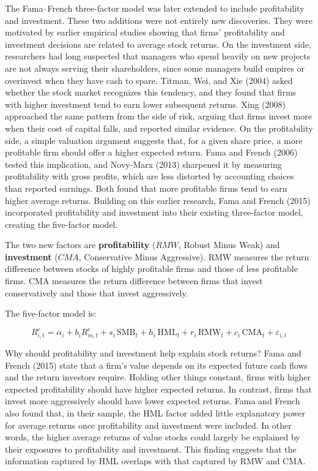 The Fama--French three-factor model was later extended to include profitability and investment. These two additions were not entirely new
discoveries. They were motivated by earlier empirical studies showing that firms' profitability and investment decisions are related to
average stock returns. On the investment side, researchers had long suspected that managers who spend heavily on new projects are not always serving
their shareholders, since some managers build empires or overinvest when they have cash to spare. Titman, Wei, and Xie (2004) asked
whether the stock market recognizes this tendency, and they found that firms with higher investment tend to earn lower subsequent
returns. Xing (2008) approached the same pattern from the side of risk, arguing that firms invest more when their cost of capital falls,
and reported similar evidence. On the profitability side, a simple valuation argument suggests that, for a given share price, a more
profitable firm should offer a higher expected return. Fama and French (2006) tested this implication, and Novy-Marx (2013) sharpened
it by measuring profitability with gross profits, which are less distorted by accounting choices than reported earnings. Both found that more
profitable firms tend to earn higher average returns. Building on this earlier research, Fama and French (2015) incorporated profitability
and investment into their existing three-factor model, creating the five-factor model.

The two new factors are \textbf{profitability}  ($RMW$, Robust Minus Weak) and
\textbf{investment} ($CMA$, Conservative Minus Aggressive). RMW measures the return difference between stocks of
highly profitable firms and those of less profitable firms. CMA measures the return difference between firms that invest conservatively
and those that invest aggressively. 

The five-factor model is:

\begin{equation}
  R^{e}_{i,t} = \alpha_i + b_i R^{e}_{m,t} + s_i \,\mathrm{SMB}_t + h_i \,\mathrm{HML}_t + r_i \,\mathrm{RMW}_t + c_i \,\mathrm{CMA}_t + \varepsilon_{i,t}
  \label{eq:04-ff5}
\end{equation}

Why should profitability and investment help explain stock returns? Fama and French (2015) state that a firm's value depends on its expected future cash flows and the return investors require.
Holding other things constant, firms with higher expected profitability should have higher expected returns. In contrast, firms that invest
more aggressively should have lower expected returns. 
Fama and French also found that, in their sample, the
HML factor added little explanatory power for average returns once profitability and investment were included. In other words, the
higher average returns of value stocks could largely be explained by their exposures to profitability and investment. This finding suggests
that the information captured by HML overlaps with that captured by RMW and CMA.

